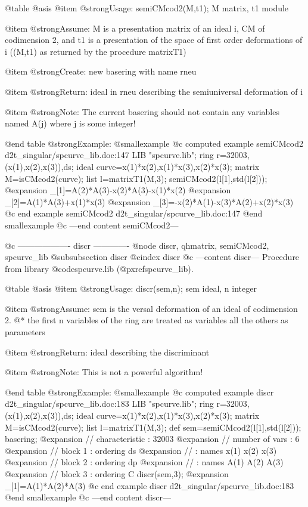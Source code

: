 @table @asis
@item @strong{Usage:}
semiCMcod2(M,t1); M matrix, t1 module

@item @strong{Assume:}
M is a presentation matrix of an ideal i, CM of codimension 2,
and t1 is a presentation of the space of first order deformations
of i ((M,t1) as returned by the procedure matrixT1)

@item @strong{Create:}
new basering with name rneu

@item @strong{Return:}
ideal in rneu describing the semiuniversal deformation of i

@item @strong{Note:}
The current basering should not contain any variables named
A(j) where j is some integer!

@end table
@strong{Example:}
@smallexample
@c computed example semiCMcod2 d2t_singular/spcurve_lib.doc:147 
LIB "spcurve.lib";
ring r=32003,(x(1),x(2),x(3)),ds;
ideal curve=x(1)*x(2),x(1)*x(3),x(2)*x(3);
matrix M=isCMcod2(curve);
list l=matrixT1(M,3);
semiCMcod2(l[1],std(l[2]));
@expansion{} _[1]=A(2)*A(3)-x(2)*A(3)-x(1)*x(2)
@expansion{} _[2]=A(1)*A(3)+x(1)*x(3)
@expansion{} _[3]=-x(2)*A(1)-x(3)*A(2)+x(2)*x(3)
@c end example semiCMcod2 d2t_singular/spcurve_lib.doc:147
@end smallexample
@c ---end content semiCMcod2---

@c ------------------- discr -------------
@node discr, qhmatrix, semiCMcod2, spcurve_lib
@subsubsection discr
@cindex discr
@c ---content discr---
Procedure from library @code{spcurve.lib} (@pxref{spcurve_lib}).

@table @asis
@item @strong{Usage:}
discr(sem,n); sem ideal, n integer

@item @strong{Assume:}
sem is the versal deformation of an ideal of codimension 2. @*
the first n variables of the ring are treated as variables
all the others as parameters

@item @strong{Return:}
ideal describing the discriminant

@item @strong{Note:}
This is not a powerful algorithm!

@end table
@strong{Example:}
@smallexample
@c computed example discr d2t_singular/spcurve_lib.doc:183 
LIB "spcurve.lib";
ring r=32003,(x(1),x(2),x(3)),ds;
ideal curve=x(1)*x(2),x(1)*x(3),x(2)*x(3);
matrix M=isCMcod2(curve);
list l=matrixT1(M,3);
def sem=semiCMcod2(l[1],std(l[2]));
basering;
@expansion{} //   characteristic : 32003
@expansion{} //   number of vars : 6
@expansion{} //        block   1 : ordering ds
@expansion{} //                  : names    x(1) x(2) x(3) 
@expansion{} //        block   2 : ordering dp
@expansion{} //                  : names    A(1) A(2) A(3) 
@expansion{} //        block   3 : ordering C
discr(sem,3);
@expansion{} _[1]=A(1)*A(2)*A(3)
@c end example discr d2t_singular/spcurve_lib.doc:183
@end smallexample
@c ---end content discr---

